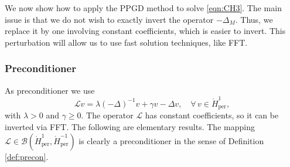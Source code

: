 \documentclass{amsart}
\newcommand{\Hm}{{\mathring H_{\mathrm{per}}^{-1}}}
\newcommand{\Homz}{{\mathring{H}_{\mathrm{per}}^{1}}}
\newcommand{\calB}{{\mathcal{B}}}
\newcommand{\LL}{\mathcal{L}}
\theoremstyle{definition}
\begin{document}
We now show how to apply the PPGD method to solve \eqref{eqn:CH3}. The main issue is that we do not wish to exactly invert the operator $-\Delta_M$. Thus, we replace it by one involving constant coefficients, which is easier to invert. This perturbation will allow us to use fast solution techniques, like FFT.

\subsubsection{Preconditioner}

As preconditioner we use
\begin{equation}\label{obj:LL}
	\LL v = \lambda(-\Delta)^{-1}v + \gamma v - \Delta v, \quad \forall \, v\in \Homz,   
\end{equation}
with $\lambda >0$ and $\gamma\ge0$. The operator $\LL$ has constant coefficients, so it can be inverted via FFT. The following are elementary results. The mapping $\LL \in \calB(\Homz,\Hm)$ is clearly a preconditioner in the sense of Definition \ref{def:precon}.
\end{document}
